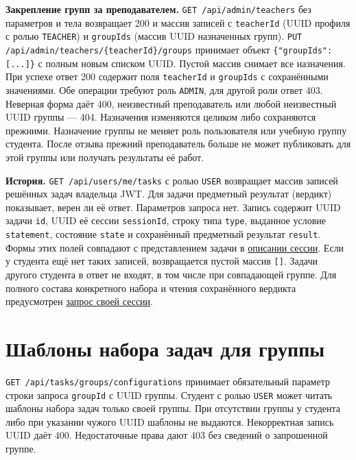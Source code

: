 \documentclass[12pt,a4paper]{article}
\begin{document}
\textbf{Закрепление групп за преподавателем.} \texttt{GET /\allowbreak{}api/\allowbreak{}admin/\allowbreak{}teachers} без параметров и тела возвращает 200 и массив записей с \texttt{teacherId} (UUID профиля с ролью \texttt{TEACHER}) и \texttt{groupIds} (массив UUID назначенных групп). \texttt{PUT /\allowbreak{}api/\allowbreak{}admin/\allowbreak{}teachers/\allowbreak{}\{teacher\allowbreak{}Id\}/\allowbreak{}groups} принимает объект \texttt{\{"group\allowbreak{}Ids":[.\allowbreak{}.\allowbreak{}.\allowbreak{}]\}} с полным новым списком UUID. Пустой массив снимает все назначения. При успехе ответ 200 содержит поля \texttt{teacherId} и \texttt{groupIds} с сохранёнными значениями. Обе операции требуют роль \texttt{ADMIN}, для другой роли ответ 403. Неверная форма даёт 400, неизвестный преподаватель или любой неизвестный UUID группы --- 404. Назначения изменяются целиком либо сохраняются прежними. Назначение группы не меняет роль пользователя или учебную группу студента. После отзыва прежний преподаватель больше не может публиковать для этой группы или получать результаты её работ.

\textbf{История.} \texttt{GET /\allowbreak{}api/\allowbreak{}users/\allowbreak{}me/\allowbreak{}tasks} с ролью \texttt{USER} возвращает массив записей решённых задач владельца JWT. Для задачи предметный результат (вердикт) показывает, верен ли её ответ. Параметров запроса нет. Запись содержит UUID задачи \texttt{id}, UUID её сессии \texttt{sessionId}, строку типа \texttt{type}, выданное условие \texttt{statement}, состояние \texttt{state} и сохранённый предметный результат \texttt{result}. Формы этих полей совпадают с представлением задачи в {\hyperlink{1-создание-сессии}{описании сессии}}. Если у студента ещё нет таких записей, возвращается пустой массив \texttt{{[}{]}}. Задачи другого студента в ответ не входят, в том числе при совпадающей группе. Для полного состава конкретного набора и чтения сохранённого вердикта предусмотрен {\hyperlink{3-чтение-состояния-и-восстановление-после-обрыва-связи}{запрос своей сессии}}.

\section{Шаблоны набора задач для группы}\label{ux448ux430ux431ux43bux43eux43dux44b-ux43dux430ux431ux43eux440ux430-ux437ux430ux434ux430ux447-ux434ux43bux44f-ux433ux440ux443ux43fux43fux44b}

\hypertarget{шаблоны-набора-задач-для-группы}{}

\texttt{GET /\allowbreak{}api/\allowbreak{}tasks/\allowbreak{}groups/\allowbreak{}configurations} принимает обязательный параметр строки запроса \texttt{groupId} с UUID группы. Студент с ролью \texttt{USER} может читать шаблоны набора задач только своей группы. При отсутствии группы у студента либо при указании чужого UUID шаблоны не выдаются. Некорректная запись UUID даёт 400. Недостаточные права дают 403 без сведений о запрошенной группе.
\end{document}
